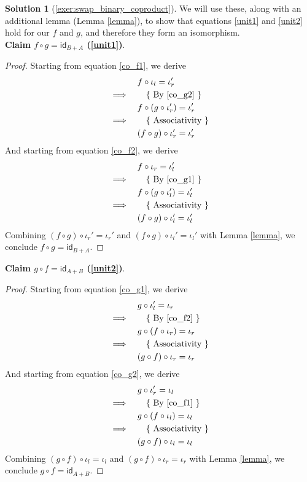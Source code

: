 \documentclass[a4paper,11pt, oneside,titlepage=false]{scrbook}
\theoremstyle{plain}
\theoremstyle{definition}
\newtheorem{solution}[thm]{Solution}
\newcommand{\cfont}[1]{\ensuremath{\mathsf{#1}}}
\newcommand{\Id}[1][]{\cfont{id}_{#1}}
\newcommand{\inl}{\ensuremath{\iota_l}}
\newcommand{\inr}{\ensuremath{\iota_r}}
\newcommand{\co}[2]{\ensuremath{#2 \circ #1}}
\begin{document}
\begin{solution}[\cref{exer:swap_binary_coproduct}]
We will use these, along with an additional lemma (Lemma \ref{lemma}), to show that equations \ref{unit1} and \ref{unit2} hold for our $f$ and $g$, and therefore they form an isomorphism.\\

\noindent
\textbf{Claim $\co {g} {f} = \Id[B+A]$ (\ref{unit1})}.
\begin{proof}
Starting from equation \ref{co_f1}, we derive
\begin{align*}
 &\quad \co {\inl} {f} = \inr' \\
\implies&\qquad \text{\{ By \ref{co_g2} \}} \\
 &\quad \co {(\co {\inr'} {g})} {f} = \inr'  \\
\implies&\qquad \text{\{ Associativity \}} \\
 &\quad \co {\inr'} {(\co {g} {f})} = \inr'
\end{align*}
\noindent
And starting from equation \ref{co_f2}, we derive
\begin{align*}
 &\quad \co {\inr} {f} = \inl' \\
\implies&\qquad \text{\{ By \ref{co_g1} \}} \\
 &\quad \co {(\co {\inl'} {g})} {f} = \inl'  \\
\implies&\qquad \text{\{ Associativity \}} \\
 &\quad \co {\inl'} {(\co {g} {f})} = \inl'
\end{align*}
\noindent
Combining $\co {\inr'} {(\co {g} {f})} = \inr'$ and $\co {\inl'} {(\co {g} {f})} = \inl'$ with Lemma \ref{lemma}, we conclude $\co {g} {f}=\Id[B+A]$.
\end{proof}

\noindent
\textbf{Claim $\co {f} {g} = \Id[A+B]$ (\ref{unit2})}.
\begin{proof}
Starting from equation \ref{co_g1}, we derive
\begin{align*}
 &\quad \co {\inl'} {g} = \inr \\
\implies&\qquad \text{\{ By \ref{co_f2} \}} \\
 &\quad \co {(\co {\inr} {f})} {g} = \inr  \\
\implies&\qquad \text{\{ Associativity \}} \\
 &\quad \co {\inr} {(\co {f} {g})} = \inr
\end{align*}
\noindent
And starting from equation \ref{co_g2}, we derive
\begin{align*}
 &\quad \co {\inr'} {g} = \inl \\
\implies&\qquad \text{\{ By \ref{co_f1} \}} \\
 &\quad \co {(\co {\inl} {f})} {g} = \inl  \\
\implies&\qquad \text{\{ Associativity \}} \\
 &\quad \co {\inl} {(\co {f} {g})} = \inl
\end{align*}
\noindent
Combining $\co {\inl} {(\co {f} {g})} = \inl$ and $\co {\inr} {(\co {f} {g})} = \inr$ with Lemma \ref{lemma}, we conclude $\co {f} {g}=\Id[A+B]$.
\end{proof}


\end{solution}
\end{document}
